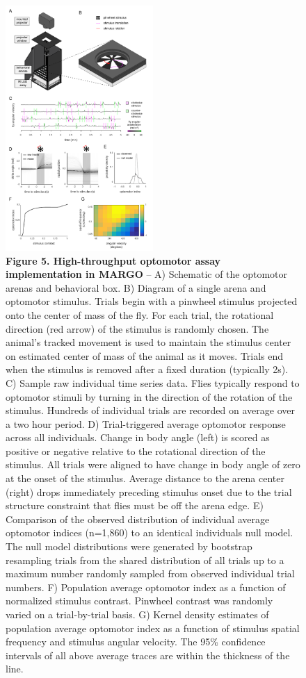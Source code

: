 \documentclass[10pt]{article}
\begin{document}
\newpage
\begin{figure}[h!]
	\begin{center}
		\includegraphics[width=0.5\textwidth]{../figures/optomotor_panel_sm.pdf}
	\end{center}
	\caption*{\footnotesize \textbf{Figure 5. High-throughput optomotor assay implementation in MARGO} -- A) Schematic of the optomotor arenas and behavioral box. B) Diagram of a single arena and optomotor stimulus. Trials begin with a pinwheel stimulus projected onto the center of mass of the fly. For each trial, the rotational direction (red arrow) of the stimulus is randomly chosen. The animal's tracked movement is used to maintain the stimulus center on estimated center of mass of the animal as it moves. Trials end when the stimulus is removed after a fixed duration (typically 2s). C) Sample raw individual time series data. Flies typically respond to optomotor stimuli by turning in the direction of the rotation of the stimulus. Hundreds of individual trials are recorded on average over a two hour period. D) Trial-triggered average optomotor response across all individuals. Change in body angle (left) is scored as positive or negative relative to the rotational direction of the stimulus. All trials were aligned to have change in body angle of zero at the onset of the stimulus. Average distance to the arena center (right) drops immediately preceding stimulus onset due to the trial structure constraint that flies must be off the arena edge. E) Comparison of the observed distribution of individual average optomotor indices (n=1,860) to an identical individuals null model. The null model distributions were generated by bootstrap resampling trials from the shared distribution of all trials up to a maximum number randomly sampled from observed individual trial numbers. F) Population average optomotor index as a function of normalized stimulus contrast. Pinwheel contrast was randomly varied on a trial-by-trial basis. G) Kernel density estimates of population average optomotor index as a function of stimulus spatial frequency and stimulus angular velocity. The 95\% confidence intervals of all above average traces are within the thickness of the line.}
\end{figure}
\end{document}
